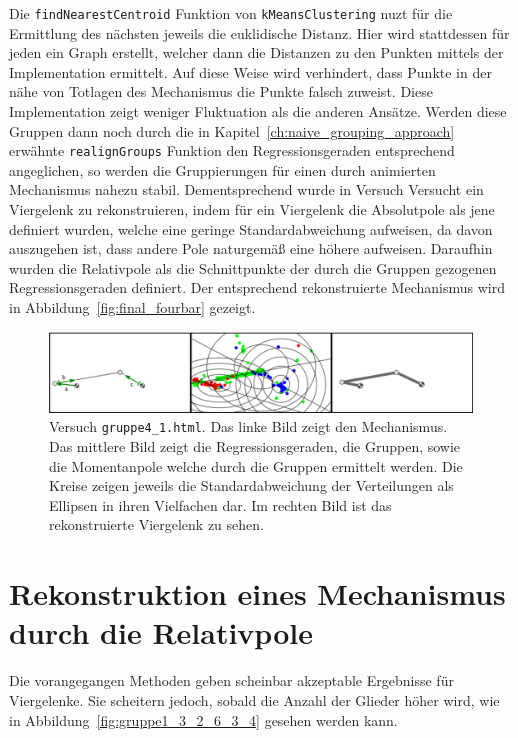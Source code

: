 Die \lstinline{findNearestCentroid} Funktion von \lstinline{kMeansClustering} nuzt für die Ermittlung des nächsten  jeweils die euklidische Distanz.
Hier wird stattdessen für jeden  ein Graph erstellt, welcher dann die Distanzen zu den Punkten mittels der  Implementation ermittelt.
Auf diese Weise wird verhindert, dass Punkte in der nähe von Totlagen des Mechanismus die Punkte falsch zuweist.
Diese Implementation zeigt weniger Fluktuation als die anderen Ansätze.
Werden diese Gruppen dann noch durch die in Kapitel~\ref{ch:naive_grouping_approach} erwähnte \lstinline{realignGroups} Funktion den Regressionsgeraden entsprechend angeglichen, so werden die Gruppierungen für einen durch  animierten Mechanismus nahezu stabil.
Dementsprechend wurde in Versuch  Versucht ein Viergelenk zu rekonstruieren, indem für ein Viergelenk die Absolutpole als jene definiert wurden, welche eine geringe Standardabweichung aufweisen, da davon auszugehen ist, dass andere Pole naturgemäß eine höhere aufweisen.
Daraufhin wurden die Relativpole als die Schnittpunkte der durch die Gruppen gezogenen Regressionsgeraden definiert.
Der entsprechend rekonstruierte Mechanismus wird in Abbildung~\ref{fig:final_fourbar} gezeigt.

\begin{figure}
    \centering
    \includegraphics[width=\textwidth]{gfx/gruppe4_1.png}
    \caption[Versuch \lstinline{gruppe4_1.html}]{Versuch \lstinline{gruppe4_1.html}. Das linke Bild zeigt den Mechanismus. Das mittlere Bild zeigt die Regressionsgeraden, die Gruppen, sowie die Momentanpole welche durch die Gruppen ermittelt werden. Die Kreise zeigen jeweils die Standardabweichung der Verteilungen als Ellipsen in ihren Vielfachen dar. Im rechten Bild ist das rekonstruierte Viergelenk zu sehen.}
    \label{fig:gruppe3_3}
\end{figure}

\section{Rekonstruktion eines Mechanismus durch die Relativpole}

Die vorangegangen Methoden geben scheinbar akzeptable Ergebnisse für Viergelenke.
Sie scheitern jedoch, sobald die Anzahl der Glieder höher wird, wie in Abbildung~\ref{fig:gruppe1_3_2_6_3_4} gesehen werden kann.

